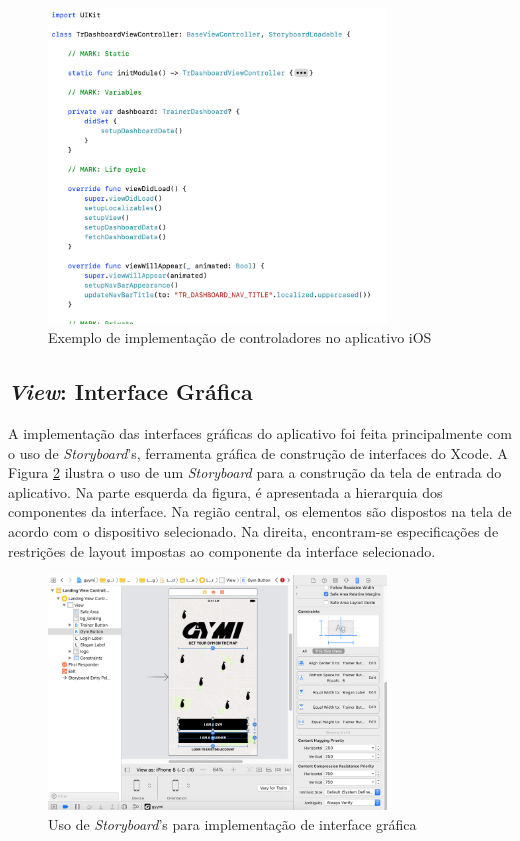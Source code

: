 \begin{figure}[H]
    \centering
    \includegraphics[width=0.8\textwidth]{pfc/figuras/ex-tr-dashboard.png}
    \caption{Exemplo de implementação de controladores no aplicativo iOS}
    \label{fig:controller-example}
\end{figure}

\subsection{\textit{View}: Interface Gráfica}
A implementação das interfaces gráficas do aplicativo foi feita principalmente com o uso de \textit{Storyboard}'s, ferramenta gráfica de construção de interfaces do Xcode. A Figura \ref{fig:storyboard} ilustra o uso de um \textit{Storyboard} para a construção da tela de entrada do aplicativo. Na parte esquerda da figura, é apresentada a hierarquia dos componentes da interface. Na região central, os elementos são dispostos na tela de acordo com o dispositivo selecionado. Na direita, encontram-se especificações de restrições de layout impostas ao componente da interface selecionado.

\begin{figure}[H]
    \centering
    \includegraphics[width=0.8\textwidth]{pfc/figuras/storyboard.png}
    \caption{Uso de \textit{Storyboard}'s para implementação de interface gráfica}
    \label{fig:storyboard}
\end{figure}

